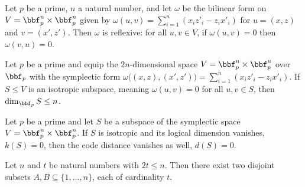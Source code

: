 \begin{lemma}
\label{symB_isRefl}
\leanok
{}
Let $p$ be a prime, $n$ a natural number, and let $\omega$ be the bilinear form on $V =
\bbf_p^n \times \bbf_p^n$ given by $\omega(u,v) = \sum_{i=1}^{n}(x_i z'_i - z_i x'_i)$
for $u = (x,z)$ and $v = (x',z')$. Then $\omega$ is reflexive: for all $u, v \in V$, if
$\omega(u,v) = 0$ then $\omega(v,u) = 0$.
\end{lemma}

\begin{lemma}
\label{finrank_le_n_of_isotropic}
\leanok
{}
Let $p$ be a prime and equip the $2n$-dimensional space $V = \bbf_p^n \times \bbf_p^n$
over $\bbf_p$ with the symplectic form $\omega\big((x,z),(x',z')\big) = \sum_{i=1}^{n}
(x_i z'_i - z_i x'_i)$. If $S \le V$ is an isotropic subspace, meaning $\omega(u,v) = 0$
for all $u, v \in S$, then $\dim_{\bbf_p} S \le n$.
\end{lemma}

\begin{lemma}
\label{code_dist_eq_zero_of_code_k_eq_zero}
\leanok
{}
Let $p$ be a prime and let $S$ be a subspace of the symplectic space $V = \bbf_p^n
\times \bbf_p^n$. If $S$ is isotropic and its logical dimension vanishes, $k(S) = 0$,
then the code distance vanishes as well, $d(S) = 0$.
\end{lemma}

\begin{lemma}
\label{exists_disjoint_finsets_card}
\leanok
{}
Let $n$ and $t$ be natural numbers with $2t \le n$. Then there exist two disjoint
subsets $A, B \subseteq \{1, \dots, n\}$, each of cardinality $t$.
\end{lemma}

